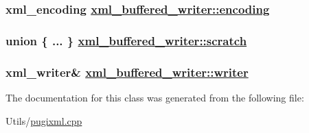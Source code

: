 \hypertarget{classxml__buffered__writer_b810a7286598172e1549561b285f08fb}{
\subsubsection[encoding]{\setlength{\rightskip}{0pt plus 5cm}xml\_\-encoding \hyperlink{classxml__buffered__writer_b810a7286598172e1549561b285f08fb}{xml\_\-buffered\_\-writer::encoding}}}
\label{classxml__buffered__writer_b810a7286598172e1549561b285f08fb}


\hypertarget{classxml__buffered__writer_99e9007c9af7b48a758adb0cbc55a147}{
\subsubsection[scratch]{\setlength{\rightskip}{0pt plus 5cm}union \{ ... \}   \hyperlink{classxml__buffered__writer_99e9007c9af7b48a758adb0cbc55a147}{xml\_\-buffered\_\-writer::scratch}}}
\label{classxml__buffered__writer_99e9007c9af7b48a758adb0cbc55a147}


\hypertarget{classxml__buffered__writer_37cdd45f867937e1978565f5a0fa318b}{
\subsubsection[writer]{\setlength{\rightskip}{0pt plus 5cm}xml\_\-writer\& \hyperlink{classxml__buffered__writer_37cdd45f867937e1978565f5a0fa318b}{xml\_\-buffered\_\-writer::writer}}}
\label{classxml__buffered__writer_37cdd45f867937e1978565f5a0fa318b}




The documentation for this class was generated from the following file:\begin{CompactItemize}
\item 
Utils/\hyperlink{pugixml_8cpp}{pugixml.cpp}\end{CompactItemize}
